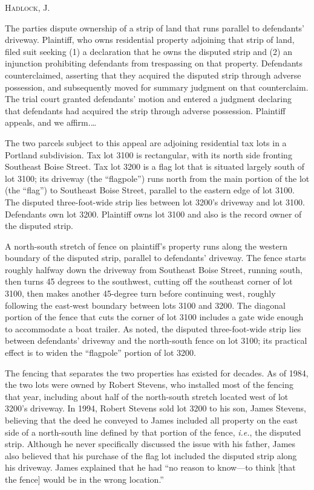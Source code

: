 
\opinion \textsc{Hadlock}, J.

The parties dispute ownership of a strip of land that runs parallel to
defendants' driveway. Plaintiff, who owns residential property adjoining that
strip of land, filed suit seeking (1) a declaration that he owns the disputed
strip and (2) an injunction prohibiting defendants from trespassing on that
property. Defendants counterclaimed, asserting that they acquired the disputed
strip through adverse possession, and subsequently moved for summary judgment
on that counterclaim. The trial court granted defendants' motion and entered a
judgment declaring that defendants had acquired the strip through adverse
possession. Plaintiff appeals, and we affirm.\ldots


The two parcels subject to this appeal are adjoining residential tax lots in a
Portland subdivision. Tax lot 3100 is rectangular, with its north side fronting
Southeast Boise Street. Tax lot 3200 is a flag lot that is situated largely
south of lot 3100; its driveway (the ``flagpole'') runs north from the main
portion of the lot (the ``flag'') to Southeast Boise Street, parallel to the
eastern edge of lot 3100. The disputed three-foot-wide strip lies between lot
3200's driveway and lot 3100. Defendants own lot 3200. Plaintiff owns lot 3100
and also is the record owner of the disputed strip. 

A north-south stretch of fence on plaintiff's property runs along the western
boundary of the disputed strip, parallel to defendants' driveway. The fence
starts roughly halfway down the driveway from Southeast Boise Street, running
south, then turns 45 degrees to the southwest, cutting off the southeast corner
of lot 3100, then makes another 45-degree turn before continuing west, roughly
following the east-west boundary between lots 3100 and 3200. The diagonal
portion of the fence that cuts the corner of lot 3100 includes a gate wide
enough to accommodate a boat trailer. As noted, the disputed three-foot-wide
strip lies between defendants' driveway and the north-south fence on lot 3100;
its practical effect is to widen the ``flagpole'' portion of lot 3200. 

The fencing that separates the two properties has existed for decades. As of
1984, the two lots were owned by Robert Stevens, who installed most of the
fencing that year, including about half of the north-south stretch located west
of lot 3200's driveway. In 1994, Robert Stevens sold lot 3200 to his son, James
Stevens, believing that the deed he conveyed to James included all property on
the east side of a north-south line defined by that portion of the fence,
\textit{i.e.}, the disputed strip. Although he never specifically discussed the
issue with his father, James also believed that his purchase of the
flag lot included the disputed strip along his driveway. James explained that
he had ``no reason to know---to think [that the fence] would be in the wrong
location.''

